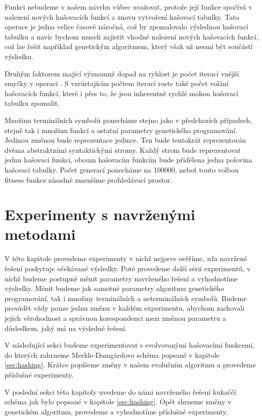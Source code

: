Funkci  nebudeme v našem návrhu vůbec uvažovat, protože její funkce spočívá v nalezení
nových hašovacích funkcí a znovu vytvoření hašovací tabulky. Tato operace je jedna velice časově
náročná, což by zpomalovalo výslednou hašovací tabulku a navíc bychom museli zajistit vhodné nalezení
nových hašovacích funkcí, což lze řešit například genetickým algoritmem, který však už nesmí být
součástí výsledku.

Druhým faktorem mající významný dopad na ryhlost je počet iterací vnější smyčky v operaci
. S vzrůstajícím počtem iterací roste také počet volání hašovacích funkcí, které
i přes to, že jsou inherentně rychlé mohou hašovací tabulku zpomalit.

Množinu termínálních
symbolů ponecháme stejno jako v předchozích případech, stejně tak i množinu funkcí a ostatní parametry
genetického programování. Jedinou změnou bude reprezentace jedince. Ten bude tentokrát reprezentován
dvěma abstraktními syntaktickými stromy. Každý strom bude reprezentovat jednu hašovací funkci, oboum
hašovacím funkcím bude přidělena jedna polovina hašovací tabulky. Počet generací ponecháme na 100000,
neboť touto volbou fitness funkce zásadně zmenšíme prohledávací prostor.

\chapter{Experimenty s navrženými metodami}

V této kapitole provedeme experimenty v nichž nejprve ověříme, zda navržené řešení poskytuje očekávané
výsledky. Poté provedeme další sérii experimentů, v níchž budeme postupně měnit parametry navrženého
řešení a vyhodnotíme výsledky. Měnit budeme jak samotné parametry algoritmu genetického
programování, tak i množiny terminálních a neterminálních symbolů. Budeme provádět vždy pouze
jednu změnu v každém experimentu, abychom zachovali jejich věrohodnost a správnou korespondenci
mezi změnou parametru a důsledkem, jaký má na výsledné řešení.

V následující sekci budeme experimentovat s evolvovanými hašovacími funkcemi, do kterých zahrneme
Merkle-Damg\r{a}rdovo schéma popsané v kapitole \ref{sec:hashing}. Krátce popíšeme změny v našem
evolučním algoritmu a provedeme příslušné experimenty.

V poslední sekci této kapitoly uvedeme do námi navrženého řešení kukaččí schéma jak bylo popsané
v kapitole \ref{sec:hashing}. Opět shrneme změny v genetickém algoritmu, provedeme a vyhodnotíme
příslušné experimenty.

